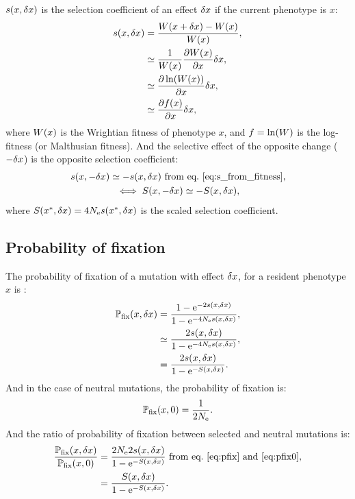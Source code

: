 \documentclass{article}
\begin{document}
$s(x, \delta x)$ is the selection coefficient of an effect $\delta x$ if the current {phenotype} is $x$:
\begin{align}
    s(x, \delta x) &= \frac{ W (x + \delta x) - W (x)}{ W ( x)}, \\
    &\simeq \frac{1}{ W (x)}\frac{ \partial W (x) }{\partial x} \delta x, \\
    &\simeq \frac{ \partial \ln (W (x))}{\partial x} \delta x, \\
    &\simeq \frac{ \partial f (x) }{\partial x} \delta x, \label{eq:s_from_fitness}
\end{align}
where $ W ( x)$ is the Wrightian fitness of {phenotype} $x$, and $ f  = \ln (W)$ is the log-fitness (or Malthusian fitness).
And the selective effect of the opposite change ($-\delta x$) is the opposite selection coefficient:
\begin{gather}
    s(x, -\delta x) \simeq - s(x, \delta x) \text{ from eq.~\ref{eq:s_from_fitness}} \label{eq:s_minus_deltax}, \\
    \iff S(x, -\delta x) \simeq - S(x, \delta x), \label{eq:S_minus_deltax}
\end{gather}
where $S(x^{*}, \delta x) = 4N_{\text{e}} s (x^{*}, \delta x)$ is the scaled selection coefficient.

\subsection{Probability of fixation}
\label{subsec:probability-of-fixation}

The probability of fixation of a mutation with effect $\delta x$, for a resident {phenotype} $x$ is :
\begin{align}
    \mathbb{P}_{\text{fix}}(x, \delta x) &= \frac{ 1 - \text{e}^{-2 s(x, \delta x)}}{1 - \text{e}^{-4N_{\text{e}} s(x, \delta x)}}, \\
    &\simeq \frac{ 2 s(x, \delta x)}{1 - \text{e}^{-4N_{\text{e}} s(x, \delta x)}}, \\
    &= \frac{ 2 s(x, \delta x)}{1 - \text{e}^{-S(x, \delta x)}}. \label{eq:pfix}
\end{align}
And in the case of {neutral} mutations, the probability of fixation is:
\begin{gather}
    \mathbb{P}_{\text{fix}}(x, 0) = \frac{ 1}{2 N_{\text{e}}} \label{eq:pfix0}.
\end{gather}
And the ratio of probability of fixation between selected and {neutral} mutations is:
\begin{align}
    \frac{\mathbb{P}_{\text{fix}}(x, \delta x)}{\mathbb{P}_{\text{fix}}(x, 0)} & = \frac{ 2 N_{\text{e}} 2 s(x, \delta x)}{1 - \text{e}^{-S(x, \delta x)}} \text{ from eq.~\ref{eq:pfix} and~\ref{eq:pfix0}},\\
    & = \frac{S(x, \delta x)}{1 - \text{e}^{-S(x, \delta x)}} \label{eq:pfixratio}.
\end{align}
\end{document}
